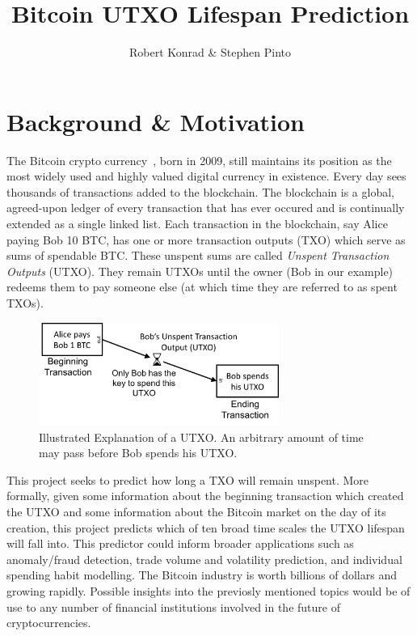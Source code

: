 \documentclass[12pt]{article}
\title{Bitcoin UTXO Lifespan Prediction}
\author{Robert Konrad \& Stephen Pinto}
\begin{document}
\maketitle

\section{Background \& Motivation}
The Bitcoin crypto currency~\cite{Na08}, born in 2009, still maintains its position as the most widely used and highly valued digital currency in existence. Every day sees thousands of transactions added to the blockchain. The blockchain is a global, agreed-upon ledger of every transaction that has ever occured and is continually extended as a single linked list. Each transaction in the blockchain, say Alice paying Bob 10 BTC, has one or more transaction outputs (TXO) which serve as sums of spendable BTC. These unspent sums are called \emph{Unspent Transaction Outputs} (UTXO). They remain UTXOs until the owner (Bob in our example) redeems them to pay someone else (at which time they are referred to as spent TXOs).

\begin{figure}
\begin{center}
\includegraphics[width=0.7\textwidth]{figures/utxo}
\end{center}
\caption{Illustrated Explanation of a UTXO. An arbitrary amount of time may pass before Bob spends his UTXO.}
\label{utxo}
\end{figure}

This project seeks to predict how long a TXO will remain unspent. More formally, given some information about the beginning transaction which created the UTXO and some information about the Bitcoin market on the day of its creation, this project predicts which of ten broad time scales the UTXO lifespan will fall into. This predictor could inform broader applications such as anomaly/fraud detection, trade volume and volatility prediction, and individual spending habit modelling. The Bitcoin industry is worth billions of dollars and growing rapidly. Possible insights into the previosly mentioned topics would be of use to any number of financial institutions involved in the future of cryptocurrencies. 
\end{document}
